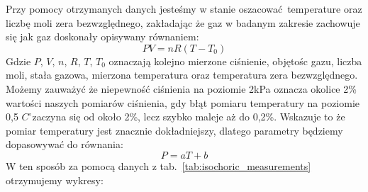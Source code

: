 \documentclass[12pt]{article}
\begin{document}
Przy pomocy otrzymanych danych jesteśmy w stanie oszacować temperature oraz liczbę moli zera bezwzględnego, zakładając że gaz w badanym zakresie zachowuje się jak gaz doskonały opisywany równaniem\cite{skrypt}:
\[
    PV = nR(T - T_0)
\]
Gdzie \(P\), \(V\), \(n\), \(R\), \(T\), \(T_0\) oznaczają kolejno mierzone ciśnienie, objętośc gazu, liczba moli, stała gazowa, mierzona temperatura oraz temperatura zera bezwzględnego. Możemy zauważyć że niepewność ciśnienia na poziomie 2kPa oznacza okolice 2\% wartości naszych pomiarów ciśnienia, gdy błąt pomiaru temperatury na poziomie 0{,}5 \(C^\circ\)zaczyna się od około 2\%, lecz szybko maleje aż do 0{,}2\%. Wskazuje to że pomiar temperatury jest znacznie dokładniejszy, dlatego parametry będziemy dopasowywać do równania:
\[
    P = aT + b
\]
W ten sposób za pomocą danych z tab.~\ref{tab:isochoric_measurements} otrzymujemy wykresy:
\end{document}
